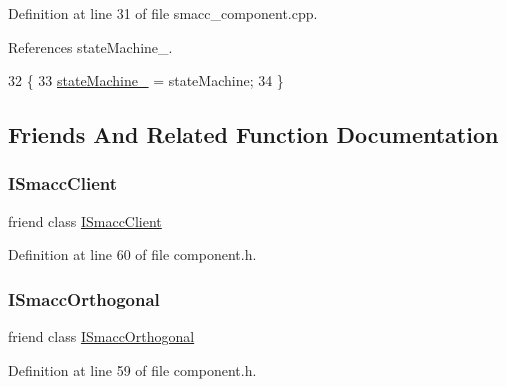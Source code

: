 Definition at line 31 of file smacc\+\_\+component.\+cpp.



References state\+Machine\+\_\+.


\begin{DoxyCode}
32 \{
33     \hyperlink{classsmacc_1_1ISmaccComponent_ae3f37acc1679f79299b86872d4b1f80f}{stateMachine\_} = stateMachine;
34 \}
\end{DoxyCode}


\subsection{Friends And Related Function Documentation}
\mbox{\label{classsmacc_1_1ISmaccComponent_a64e981df7a9da02075b7668b3391ca1e}} 
\subsubsection{\texorpdfstring{I\+Smacc\+Client}{ISmaccClient}}
{\footnotesize\ttfamily friend class \hyperlink{classsmacc_1_1ISmaccClient}{I\+Smacc\+Client}\hspace{0.3cm}{\ttfamily [friend]}}



Definition at line 60 of file component.\+h.

\mbox{\label{classsmacc_1_1ISmaccComponent_a7205cc84a71fea903124d54d01e99a68}} 
\subsubsection{\texorpdfstring{I\+Smacc\+Orthogonal}{ISmaccOrthogonal}}
{\footnotesize\ttfamily friend class \hyperlink{classsmacc_1_1ISmaccOrthogonal}{I\+Smacc\+Orthogonal}\hspace{0.3cm}{\ttfamily [friend]}}



Definition at line 59 of file component.\+h.



